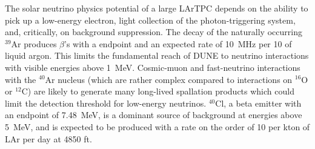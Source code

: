 The solar neutrino physics potential of a large LArTPC depends
on the ability to pick up a low-energy electron, light collection of the photon-triggering system,
and, critically, on background suppression. 
The decay of the naturally occurring $^{39}$Ar
produces $\beta$'s with a  endpoint and an expected rate
of \SI{10}{\MHz} per \SI{10}{\kt} of liquid argon. This limits the
fundamental reach of DUNE to neutrino interactions with visible
energies above \SI{1}{\MeV}. 
Cosmic-muon and fast-neutrino  interactions with the $^{40}$Ar nucleus (which are rather complex
compared to interactions on $^{16}$O or $^{12}$C) are likely to generate many long-lived spallation products which could limit the
detection threshold for low-energy neutrinos.
$^{40}$Cl, a beta emitter with an
endpoint of \SI{7.48}{\MeV}, is a dominant source of background at
energies above \SI{5}{\MeV}, and is expected to be produced with a rate on the order of 10 per kton of LAr per day at 4850 ft.


